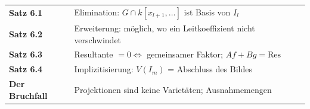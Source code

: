 \begin{merksatz}
\begin{center}
\renewcommand{\arraystretch}{1.5}
\begin{tabular}{@{}P{3.0cm}P{5.6cm}@{}}
\toprule
\textbf{Satz 6.1} & Elimination: $G\cap k[x_{l+1}, \ldots]$ ist Basis von $I_l$\\
\textbf{Satz 6.2} & Erweiterung: möglich, wo ein Leitkoeffizient nicht verschwindet\\
\textbf{Satz 6.3} & Resultante $= 0\Leftrightarrow$ gemeinsamer Faktor; $Af + Bg = \mathrm{Res}$\\
\textbf{Satz 6.4} & Implizitisierung: $V(I_m)$ = Abschluss des Bildes\\
\textbf{Der Bruchfall} & Projektionen sind keine Varietäten; Ausnahmemengen\\
\bottomrule
\end{tabular}
\end{center}

\begin{center}
\begin{minipage}{0.88\textwidth}
\end{minipage}
\end{center}
\end{merksatz}

